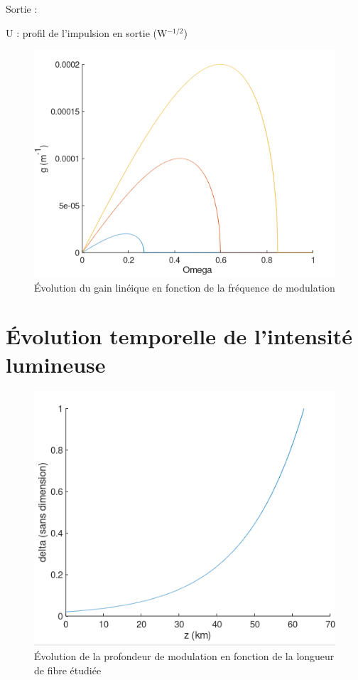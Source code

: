 \documentclass[a4paper,12pt,titlepage]{article}
\begin{document}
             Sortie :
             
            U : profil de l'impulsion en sortie (W$^{-1/2}$)
            
            \begin{figure}
                \centering
                \includegraphics{g(omega)}
                \caption{Évolution du gain linéique en fonction de la fréquence de modulation}
                \label{delta}
            \end{figure}
    
    
    \newpage
    
    \section{Évolution temporelle de l'intensité lumineuse}
    
        \begin{figure}
            \centering
            \includegraphics{delta(z)}
            \caption{Évolution de la profondeur de modulation en fonction de la longueur de fibre étudiée}
            \label{delta}
        \end{figure}
    
\end{document}
